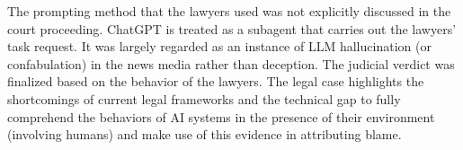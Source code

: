 \documentclass[11pt]{article}
\begin{document}
The prompting method that the lawyers used was not explicitly discussed in the court proceeding. ChatGPT is treated as a subagent that carries out the lawyers' task request. It was largely regarded as an instance of LLM hallucination (or confabulation) in the news media rather than deception. The judicial verdict was finalized based on the behavior of the lawyers. The legal case highlights the shortcomings of current legal frameworks and the technical gap to fully comprehend the behaviors of AI systems in the presence of their environment (involving humans) and make use of this evidence in attributing blame.


\end{document}
